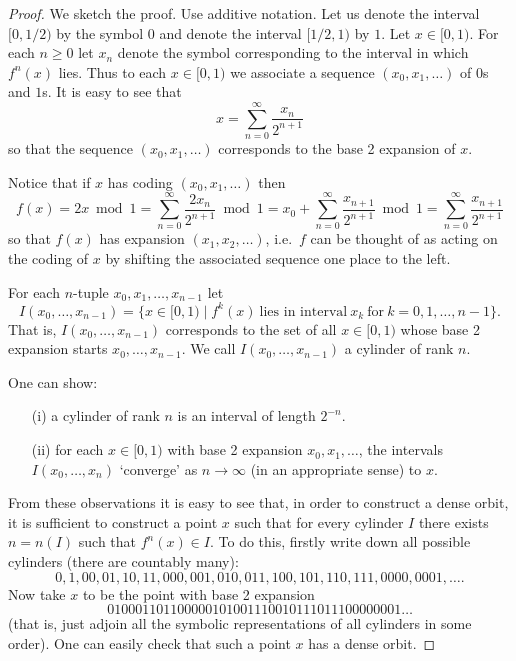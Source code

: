\documentclass[12pt]{article}
\theoremstyle{definition}
\theoremstyle{remark}
\begin{document}
\begin{proof}
We sketch the proof.  Use additive notation. Let us denote the interval $[0,1/2)$ by
the symbol $0$ and denote the interval $[1/2,1)$ by $1$.  Let $x \in
[0,1)$.  For each $n \geq 0$ let $x_{n}$ denote the symbol
corresponding to the interval in which $f^{n}(x)$ lies.  Thus to each
$x \in [0,1)$ we associate a sequence $(x_{0}, x_{1}, \ldots )$ of
$0$s and $1$s.  It is easy to see that
\[
 x = \sum_{n=0}^{\infty} \frac{x_{n}}{2^{n+1}}
\]
so that the sequence $(x_{0}, x_{1}, \ldots)$ corresponds to the
base 2 expansion of $x$.

Notice that if $x$ has coding $(x_{0}, x_{1}, \ldots)$ then
\[
 f(x) = 2x \bmod 1 = \sum_{n=0}^{\infty} \frac{2x_{n}}{2^{n+1}} \bmod 1
 = x_{0} + \sum_{n=0}^{\infty} \frac{x_{n+1}}{2^{n+1}} \bmod 1
 = \sum_{n=0}^{\infty} \frac{x_{n+1}}{2^{n+1}}
\]
so that $f(x)$ has expansion $(x_{1}, x_{2}, \ldots)$, i.e.\ $f$ can
be thought of as acting on the coding of $x$ by shifting the
associated sequence one place to the left.

For each $n$-tuple $x_{0}, x_{1}, \ldots, x_{n-1}$ let
\[
 I(x_{0}, \ldots, x_{n-1}) = \{ x \in [0,1) \mid f^{k}(x)\ \mbox{lies
 in interval}\ x_{k}\ \mbox{for}\ k = 0,1,\ldots,n-1 \}.
\]
That is, $I(x_{0}, \ldots, x_{n-1})$ corresponds to the set of all $x
\in [0,1)$ whose base 2 expansion starts $x_{0}, \ldots, x_{n-1}$.
We call $I(x_{0}, \ldots, x_{n-1})$ a cylinder of rank $n$.


One can show:
\begin{itemize}
\item[(i)]
a cylinder of rank $n$ is an interval of length $2^{-n}$.
\item[(ii)]
for each $x \in [0,1)$ with base 2 expansion $x_{0}, x_{1}, \ldots$,
the intervals $I(x_{0}, \ldots, x_{n})$ `converge' as
$n\rightarrow\infty$ (in an appropriate sense) to $x$.
\end{itemize}
From these observations it is easy to see that, in order to construct a
dense orbit, it is sufficient to construct a point $x$ such that for
every cylinder $I$ there exists $n=n(I)$ such that $f^{n}(x) \in I$.
To do this, firstly write down all possible cylinders (there are
countably many):
\[
 0,1,00,01,10,11,000,001,010,011,100,101,110,111,0000,0001,\ldots.
\]
Now take $x$ to be the point with base 2 expansion
\[
 010001101100000101001110010111011100000001\ldots
\]
(that is, just adjoin all the symbolic representations of all
cylinders in some order).  One can easily check that such a point $x$
has a dense orbit.
\end{proof}
\end{document}
